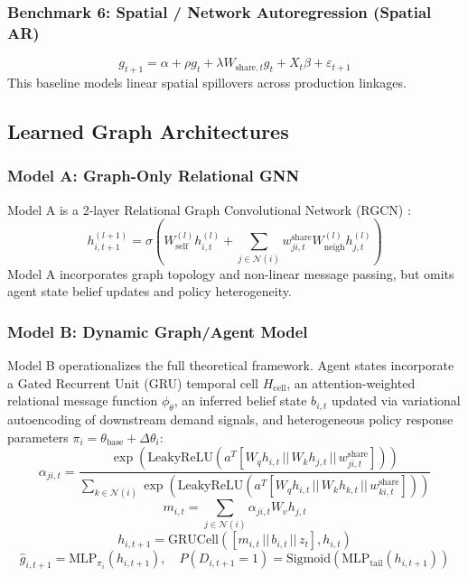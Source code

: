 \documentclass[11pt,a4paper]{article}
\newcommand{\N}{\mathcal{N}}
\begin{document}
\subsubsection{Benchmark 6: Spatial / Network Autoregression (Spatial AR)}
\begin{equation}
    g_{t+1} = \alpha + \rho g_t + \lambda W_{\text{share},t} g_t + X_t \beta + \varepsilon_{t+1}
    \label{eq:spatial_ar}
\end{equation}
This baseline models linear spatial spillovers across production linkages.

\subsection{Learned Graph Architectures}

\subsubsection{Model A: Graph-Only Relational GNN}
Model A is a 2-layer Relational Graph Convolutional Network (RGCN) \citep{kipf2017semi, gilmer2017neural}:
\begin{equation}
    h_{i,t+1}^{(l+1)} = \sigma \left( W_{\text{self}}^{(l)} h_{i,t}^{(l)} + \sum_{j \in \N(i)} w_{ji,t}^{\text{share}} W_{\text{neigh}}^{(l)} h_{j,t}^{(l)} \right)
\end{equation}
Model A incorporates graph topology and non-linear message passing, but omits agent state belief updates and policy heterogeneity.

\subsubsection{Model B: Dynamic Graph/Agent Model}
Model B operationalizes the full theoretical framework. Agent states incorporate a Gated Recurrent Unit (GRU) temporal cell $H_{\text{cell}}$, an attention-weighted relational message function $\phi_\theta$, an inferred belief state $b_{i,t}$ updated via variational autoencoding of downstream demand signals, and heterogeneous policy response parameters $\pi_i = \theta_{\text{base}} + \Delta \theta_i$:
\begin{equation}
    \alpha_{ji,t} = \frac{\exp \left( \text{LeakyReLU} \left( a^T [W_q h_{i,t} \,||\, W_k h_{j,t} \,||\, w_{ji,t}^{\text{share}}] \right) \right)}{\sum_{k \in \N(i)} \exp \left( \text{LeakyReLU} \left( a^T [W_q h_{i,t} \,||\, W_k h_{k,t} \,||\, w_{ki,t}^{\text{share}}] \right) \right)}
\end{equation}
\begin{equation}
    m_{i,t} = \sum_{j \in \N(i)} \alpha_{ji,t} W_v h_{j,t}
\end{equation}
\begin{equation}
    h_{i,t+1} = \text{GRUCell} \left( [m_{i,t} \,||\, b_{i,t} \,||\, z_t], h_{i,t} \right)
\end{equation}
\begin{equation}
    \hat{g}_{i,t+1} = \text{MLP}_{\pi_i}(h_{i,t+1}), \quad P(D_{i,t+1}=1) = \text{Sigmoid} \left( \text{MLP}_{\text{tail}}(h_{i,t+1}) \right)
\end{equation}
\end{document}

